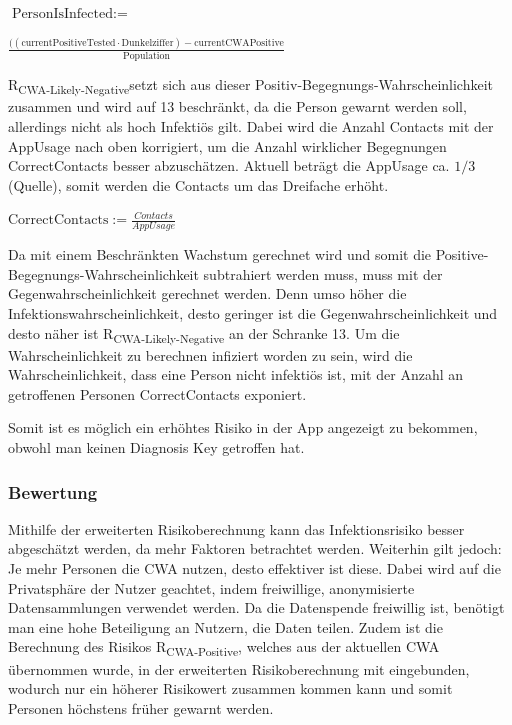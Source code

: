 \documentclass[conference]{IEEEtran}
\begin{document}
\centerline{\text{ }}
\centerline{$\text{PersonIsInfected} :=$}
\centerline{$\frac{((\text{currentPositiveTested} \cdot \text{Dunkelziffer}) - \text{currentCWAPositive}}{\text{Population}}$}
\centerline{\text{ }}

R\textsubscript{CWA-Likely-Negative}setzt sich aus dieser Positiv-Begegnungs-Wahrscheinlichkeit zusammen und wird auf 13 beschränkt, 
da die Person gewarnt werden soll, allerdings nicht als hoch Infektiös gilt. 
Dabei wird die Anzahl Contacts mit der AppUsage nach oben korrigiert, um die Anzahl wirklicher Begegnungen CorrectContacts besser abzuschätzen. 
Aktuell beträgt die AppUsage ca. $1/3$ (Quelle), somit werden die Contacts um das Dreifache erhöht. 

\centerline{\text{ }}
\centerline{$\text{CorrectContacts} := \frac{Contacts}{AppUsage}$}
\centerline{\text{ }}

Da mit einem Beschränkten Wachstum gerechnet wird und somit die Positive-Begegnungs-Wahrscheinlichkeit subtrahiert werden muss, 
muss mit der Gegenwahrscheinlichkeit gerechnet werden. Denn umso höher die  Infektionswahrscheinlichkeit, 
desto geringer ist die Gegenwahrscheinlichkeit und desto näher ist R\textsubscript{CWA-Likely-Negative} an der Schranke 13. 
Um die Wahrscheinlichkeit zu berechnen infiziert worden zu sein, wird die Wahrscheinlichkeit, dass eine Person nicht infektiös ist, 
mit der Anzahl an getroffenen Personen CorrectContacts exponiert.

\centerline{\text{ }}
\centerline{}
\centerline{}
\centerline{\text{ }}

Somit ist es möglich ein erhöhtes Risiko in der App angezeigt zu bekommen, obwohl man keinen Diagnosis Key getroffen hat. 
\\
\subsubsection{Bewertung}

Mithilfe der erweiterten Risikoberechnung kann das Infektionsrisiko besser abgeschätzt werden,
da mehr Faktoren betrachtet werden. Weiterhin gilt jedoch: Je mehr Personen die CWA nutzen, desto effektiver ist diese.
Dabei wird auf die Privatsphäre der Nutzer geachtet, indem freiwillige, anonymisierte Datensammlungen verwendet werden.
Da die Datenspende freiwillig ist, benötigt man eine hohe Beteiligung an Nutzern, die Daten teilen.
Zudem ist die Berechnung des Risikos R\textsubscript{CWA-Positive}, welches aus der aktuellen CWA übernommen wurde,
in der erweiterten Risikoberechnung mit eingebunden, wodurch nur ein höherer Risikowert zusammen kommen kann
und somit Personen höchstens früher gewarnt werden. 
\end{document}

